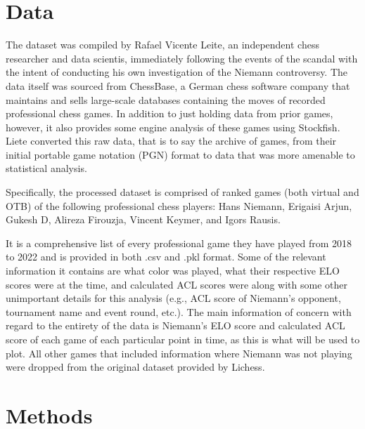 \documentclass[12pt, letterpaper, titlepage]{article}
\begin{document}
\section*{Data}
\label{sec:data}

The dataset was compiled by Rafael Vicente Leite, an independent chess researcher and data scientis, immediately following the events of the scandal with the intent of conducting his own investigation of the Niemann controversy. The data itself was sourced from ChessBase, a German chess software company that maintains and sells large-scale databases containing the moves of recorded professional chess games. In addition to just holding data from prior games, however, it also provides some engine analysis of these games using Stockfish. Liete converted this raw data, that is to say the archive of games, from their initial portable game notation (PGN) format to data that was more amenable to statistical analysis.

Specifically, the processed dataset is comprised of ranked games (both virtual and OTB) of the following professional chess players: Hans Niemann, Erigaisi Arjun, Gukesh D, Alireza Firouzja, Vincent Keymer, and Igors Rausis.

It is a comprehensive list of every professional game they have played from 2018 to 2022 and is provided in both .csv and .pkl format. Some of the relevant information it contains are what color was played, what their respective ELO scores were at the time, and calculated ACL scores were along with some other unimportant details for this analysis (e.g., ACL score of Niemann's opponent, tournament name and event round, etc.). The main information of concern with regard to the entirety of the data is Niemann's ELO score and calculated ACL score of each game of each particular point in time, as this is what will be used to plot. All other games that included information where Niemann was not playing were dropped from the original dataset provided by Lichess.

\section*{Methods}
\label{sec:sim}
\end{document}
